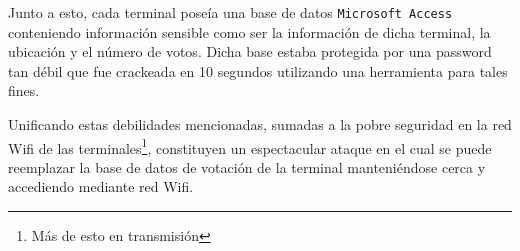 Junto a esto, cada terminal poseía una base de datos \texttt{Microsoft Access} conteniendo información sensible como ser la información de dicha terminal, la ubicación y el número de votos. Dicha base estaba protegida por una password tan débil que fue crackeada en 10 segundos utilizando una herramienta para tales fines.

Unificando estas debilidades mencionadas, sumadas a la pobre seguridad en la red Wifi de las terminales\footnote{Más de esto en transmisión}, constituyen un espectacular ataque en el cual se puede reemplazar la base de datos de votación de la terminal manteniéndose cerca y accediendo mediante red Wifi\cite{schneier}.

